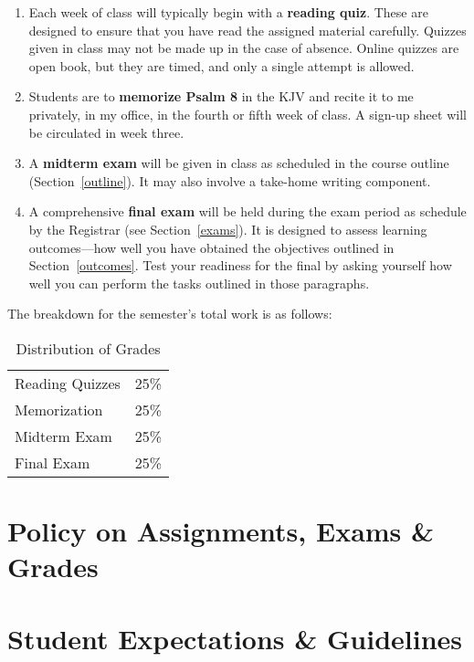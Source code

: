 \documentclass[titlepage]{article}
\newcommand\path{../../syllabus}
\begin{document}
\begin{enumerate}
 \item Each week of class will typically begin with a \textbf{reading
   quiz}. These are designed to ensure that you have read the assigned
   material carefully. Quizzes given in class may not be made up in the
   case of absence. Online quizzes are open book, but they are timed,
   and only a single attempt is allowed.
 \item Students are to \textbf{memorize Psalm 8} in the KJV and recite
   it to me privately, in my office, in the fourth or fifth week of
   class. A sign-up sheet will be circulated in week three.
 \item A \textbf{midterm exam} will be given in class as scheduled in
   the course outline (Section~\ref{outline}). It may also involve a
   take-home writing component.
 \item A comprehensive \textbf{final exam} will be held during the exam
   period as schedule by the Registrar (see Section~\ref{exams}). It is
   designed to assess learning outcomes---how well you have obtained the
   objectives outlined in Section~\ref{outcomes}. Test your readiness
   for the final by asking yourself how well you can perform the tasks
   outlined in those paragraphs.
\end{enumerate}

The breakdown for the semester's total work is as follows:

\begin{table}[htbp]
  \centering
  \begin{tabular}{lr}
    \toprule
    Reading Quizzes & 25\% \\
    Memorization    & 25\% \\
    Midterm Exam    & 25\% \\
    Final Exam      & 25\% \\
    \bottomrule
  \end{tabular}
  \caption{Distribution of Grades}
  \label{distribution}
\end{table}


\section{Policy on Assignments, Exams \& Grades}
\label{policy}






\section{Student Expectations \& Guidelines}
\label{expectations}
\end{document}
